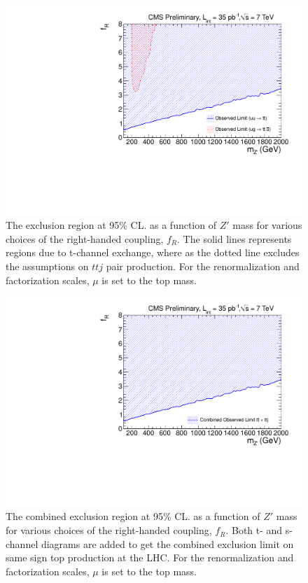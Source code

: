 \begin{figure}[htb]
\begin{center}
\includegraphics[width=0.7\linewidth]{figs/sstop_result.pdf}
\caption{ The exclusion region at 95\% CL. as a function of $Z'$ mass for various choices of the 
right-handed coupling, $f_R$. The solid lines represents regions due to t-channel exchange, where
as the dotted line excludes the assumptions on $ttj$ pair production. For the renormalization and factorization 
scales, $\mu$ is set to the top mass. \label{fig:sstopexclusion}}
\end{center}
\end{figure}

\begin{figure}[htb]
\begin{center}
\includegraphics[width=0.7\linewidth]{figs/sscomb.pdf}
\caption{ The combined exclusion region at 95\% CL. as a function of $Z'$ mass for various choices of the 
right-handed coupling, $f_R$. Both t- and s-channel diagrams are added to get the combined exclusion limit
on same sign top production at the LHC. For the renormalization and factorization 
scales, $\mu$ is set to the top mass. \label{fig:sstopcombexclusion}}
\end{center}
\end{figure}
